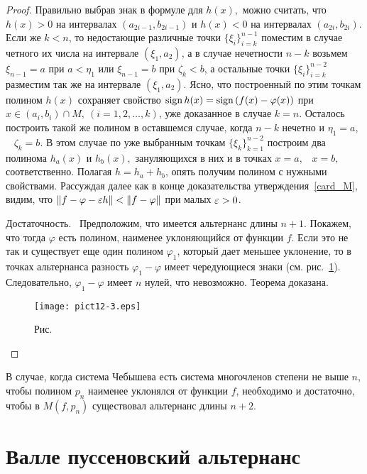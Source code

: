 \begin{proof}
Правильно выбрав знак в формуле для $h(x),$ можно считать, что $h(x)>0$ на интервалах
{$(a_{2i-1},b_{2i-1})$} и $h(x)<0$ на интервалах $(a_{2i},b_{2i})$.
{Если же $k<n$, то
недостающие различные точки $\{\xi_i\}_{i=k}^{n-1}$ поместим в случае
четного их числа на интервале $(\xi_1,a_2)$, а в случае нечетности $n-k$
возьмем $\xi_{n-1}=a$ при $a<\eta_1$ или $\xi_{n-1}=b$ при $\zeta_k<b$,
а остальные точки $\{\xi_i\}_{i=k}^{n-2}$ разместим так же на интервале
$(\xi_1,a_2).$ Ясно, что построенный по этим точкам полином $h(x)$
сохраняет свойство ${\rm sign \, } h(x)={\rm sign \, }(f(x)-\varphi(x))$ при $x\in(a_i,b_i)\cap M,\
(i=1,2,\ldots,k)$, уже доказанное в случае $k=n.$
Осталось построить такой же полином в оставшемся
случае, когда $n-k$ нечетно и $\eta_1=a,$~ $\zeta_k=b.$ В этом случае по уже
выбранным точкам $\{\xi_k\}_{k=1}^{n-2}$ построим два полинома
$h_a(x)$ и $h_b(x),$ зануляющихся в них и в точках $x=a,$~ $x=b,$ соответственно.
Полагая $h=h_a+h_b$, опять получим полином с нужными свойствами.}
Рассуждая далее как в конце доказательства утверждения~\ref{card_M}, видим, что
$\|f-\varphi-\varepsilon h\|<\|f-\varphi\|$ при малых $\varepsilon>0$.

Д\;о\;с\;т\;а\;т\;о\;ч\;н\;о\;с\;т\;ь.~ Предположим, что имеется альтернанс длины
$n+1$. Покажем, что тогда $\varphi$ есть полином, наименее
уклоняющийся от функции $f$. Если это не так и существует еще один полином
$\varphi_1$, который дает меньшее уклонение, то в точках альтернанса
{разность $\varphi_1-\varphi$ имеет чередующиеся знаки (см. рис.~\ref{r12-3}). Следовательно,}
$\varphi_1-\varphi$ имеет $n$ нулей, что
невозможно. Теорема доказана.

 \bigskip
\begin{figure}[ht]
\begin{center}
\texttt{[image: pict12-3.eps]}
\end{center}
 \bigskip
 \label{r12-3}

 \centerline{Рис.~\theris}
 \bigskip
\end{figure}


\end{proof}

\begin{Remark}
В случае, когда система Чебышева есть система многочленов степени не
выше $n$, {чтобы полином $p_n$ наименее уклонялся от функции $f$,}
необходимо и достаточно, чтобы {в $M(f,p_n)$} существовал альтернанс
длины $n+2$.
\end{Remark}


\section{Валле пуссеновский альтернанс}

